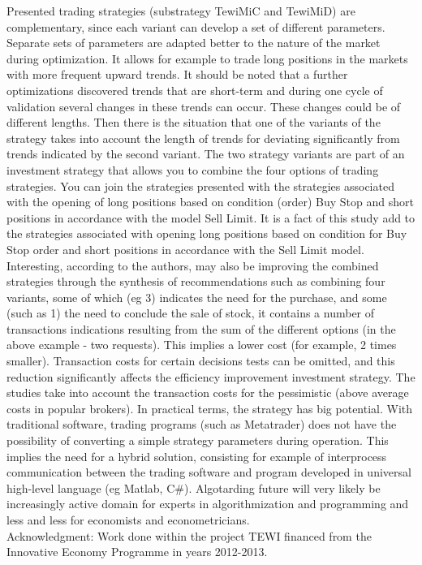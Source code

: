 \documentclass{tewiart}
\begin{document}
Presented trading strategies (substrategy TewiMiC and TewiMiD) are complementary, since each variant can develop a set of different parameters. Separate sets of parameters are adapted better to the nature of the market during optimization. It allows for example to trade long positions in the markets with more frequent upward trends. It should be noted that a further optimizations discovered trends that are short-term and during one cycle of validation several changes in these trends can occur. These changes could be of different lengths. Then there is the situation that one of the variants of the strategy takes into account the length of trends for deviating significantly from trends indicated by the second variant. The two strategy variants are part of an investment strategy that allows you to combine the four options of trading strategies. You can join the strategies presented with the strategies associated with the opening of long positions based on condition (order) Buy Stop and short positions in accordance with the model Sell Limit. It is a fact of this study add to the strategies associated with opening long positions based on condition for Buy Stop order and short positions in accordance with the Sell Limit model. Interesting, according to the authors, may also be improving the combined strategies through the synthesis of recommendations such as combining four variants, some of which (eg 3) indicates the need for the purchase, and some (such as 1) the need to conclude the sale of stock, it contains a number of transactions indications resulting from the sum of the different options (in the above example - two requests). This implies a lower cost (for example, 2 times smaller). Transaction costs for certain decisions tests can be omitted, and this reduction significantly affects the efficiency improvement investment strategy. The studies take into account the transaction costs for the pessimistic (above average costs in popular brokers). In practical terms, the strategy has big potential. With traditional software, trading programs (such as Metatrader) does not have the possibility of converting a simple strategy parameters during operation. This implies the need for a hybrid solution, consisting for example of interprocess communication between the trading software and program developed in universal high-level language (eg Matlab, C\#). Algotarding future will very likely be increasingly active domain for experts in algorithmization and programming and less and less for economists and econometricians.\\

\noindent Acknowledgment: Work done within the project TEWI financed from the Innovative Economy Programme in years 2012-2013.

 


\end{document}
